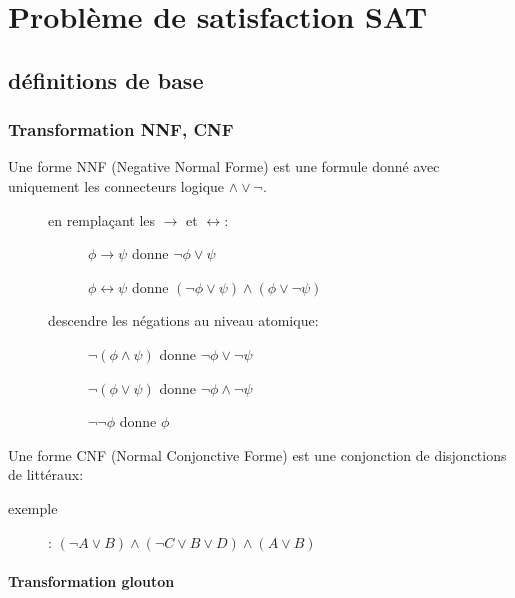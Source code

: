 \part{Problème de satisfaction SAT}
\pagebreak

\chapter{définitions de base}
\pagebreak

\section{Transformation NNF, CNF}

Une forme NNF (Negative Normal Forme) est une formule donné avec uniquement les connecteurs logique $\wedge \vee \neg$.\\

\begin{description}
\item[] en remplaçant les $\rightarrow$ et $\leftrightarrow$: \begin{description}
\item[] $\phi \rightarrow \psi$ donne $\neg \phi \vee \psi$
\item[] $\phi \leftrightarrow \psi$ donne $(\neg \phi \vee \psi) \wedge ( \phi \vee \neg \psi)$
\end{description}
\item[] descendre les négations au niveau atomique: \begin{description}
\item[] $\neg (\phi \wedge \psi)$ donne $\neg \phi \vee \neg \psi$
\item[] $\neg (\phi \vee \psi)$ donne $\neg \phi \wedge \neg \psi$
\item[] $\neg \neg \phi$ donne $\phi$
\end{description}
\end{description}

Une forme CNF (Normal Conjonctive Forme) est une conjonction de disjonctions de littéraux:
\begin{description}
\item[exemple]: $(\neg A \vee B) \wedge (\neg C \vee B \vee D) \wedge (A \vee B)$
\end{description}

\subsection{Transformation glouton}

